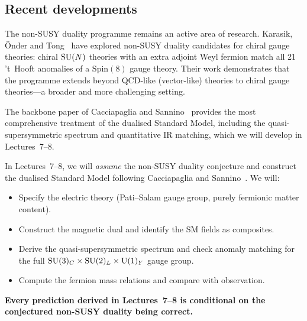 \documentclass[11pt,a4paper]{article}
\begin{document}
\subsection{Recent developments}

The non-SUSY duality programme remains an active area of research.
Karasik, \"Onder and Tong~\cite{KOT2022} have explored non-SUSY
duality candidates for chiral gauge theories: chiral $\mathrm{SU}(N)$ theories
with an extra adjoint Weyl fermion match all 21 't~Hooft anomalies of a
$\mathrm{Spin}(8)$ gauge theory.
Their work demonstrates that the programme extends beyond QCD-like
(vector-like) theories to chiral gauge theories---a broader and
more challenging setting.

The backbone paper of Cacciapaglia and
Sannino~\cite{CacciapagliaSannino2024} provides the most
comprehensive treatment of the dualised Standard Model, including the
quasi-supersymmetric spectrum and quantitative IR matching, which we
will develop in Lectures~7--8.



\begin{previewbox}[title={Preview: Lectures 7--8}]
  In Lectures~7--8, we will \emph{assume} the non-SUSY duality
  conjecture and construct the dualised Standard Model following
  Cacciapaglia and Sannino~\cite{CacciapagliaSannino2024}.  We will:
  \begin{itemize}
    \item Specify the electric theory (Pati--Salam gauge group,
      purely fermionic matter content).
    \item Construct the magnetic dual and identify the SM fields as
      composites.
    \item Derive the quasi-supersymmetric spectrum and check anomaly
      matching for the full $\mathrm{SU}(3)_C \times \mathrm{SU}(2)_L \times
      \mathrm{U}(1)_Y$ gauge group.
    \item Compute the fermion mass relations and compare with
      observation.
  \end{itemize}

  \textbf{Every prediction derived in Lectures~7--8 is conditional on
  the conjectured non-SUSY duality being correct.}
\end{previewbox}


\end{document}
